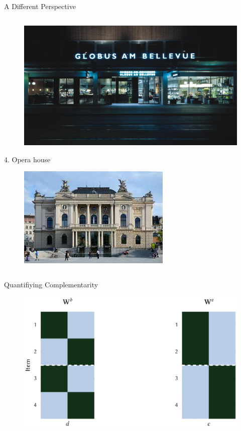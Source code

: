\documentclass{beamer}
\begin{document}
\begin{frame}{A Different Perspective}
\begin{columns}
\begin{column}{0.48\textwidth}
      \begin{figure}
        \centering
        \includegraphics[height=.2\textheight]{globus_bellevue}
      \end{figure}
      4. Opera house
      \begin{figure}
        \centering
        \includegraphics[height=.2\textheight]{zurich_opera}
      \end{figure}
    \end{column}
  \end{columns}
\end{frame}

\begin{frame}{Quantifiying Complementarity}
  \begin{figure}
    \centering
    \includegraphics[height=.8\textheight]{fldc_toy_example_mixed_weights_pres}
  \end{figure}
\end{frame}
\end{document}

